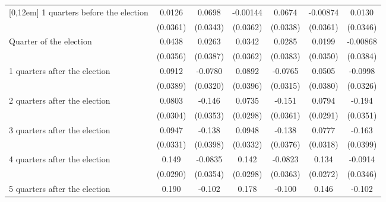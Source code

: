 \begin{table}[!ht]
\begin{tabular}{l*{6}{c}}
[0,12em]
 1 quarters before the election&      0.0126         &      0.0698\sym{*}  &    -0.00144         &      0.0674\sym{*}  &    -0.00874         &      0.0130         \\
                    &    (0.0361)         &    (0.0343)         &    (0.0362)         &    (0.0338)         &    (0.0361)         &    (0.0346)         \\
[0,12em]
Quarter of the election&      0.0438         &      0.0263         &      0.0342         &      0.0285         &      0.0199         &    -0.00868         \\
                    &    (0.0356)         &    (0.0387)         &    (0.0362)         &    (0.0383)         &    (0.0350)         &    (0.0384)         \\
[0,12em]
 1 quarters after the election&      0.0912\sym{*}  &     -0.0780\sym{*}  &      0.0892\sym{*}  &     -0.0765\sym{*}  &      0.0505         &     -0.0998\sym{**} \\
                    &    (0.0389)         &    (0.0320)         &    (0.0396)         &    (0.0315)         &    (0.0380)         &    (0.0326)         \\
[0,12em]
 2 quarters after the election&      0.0803\sym{**} &      -0.146\sym{***}&      0.0735\sym{*}  &      -0.151\sym{***}&      0.0794\sym{**} &      -0.194\sym{***}\\
                    &    (0.0304)         &    (0.0353)         &    (0.0298)         &    (0.0361)         &    (0.0291)         &    (0.0351)         \\
[0,12em]
 3 quarters after the election&      0.0947\sym{**} &      -0.138\sym{***}&      0.0948\sym{**} &      -0.138\sym{***}&      0.0777\sym{*}  &      -0.163\sym{***}\\
                    &    (0.0331)         &    (0.0398)         &    (0.0332)         &    (0.0376)         &    (0.0318)         &    (0.0399)         \\
[0,12em]
 4 quarters after the election&       0.149\sym{***}&     -0.0835\sym{*}  &       0.142\sym{***}&     -0.0823\sym{*}  &       0.134\sym{***}&     -0.0914\sym{**} \\
                    &    (0.0290)         &    (0.0354)         &    (0.0298)         &    (0.0363)         &    (0.0272)         &    (0.0346)         \\
[0,12em]
 5 quarters after the election&       0.190\sym{***}&      -0.102\sym{**} &       0.178\sym{***}&      -0.100\sym{**} &       0.146\sym{***}&      -0.102\sym{**} \\

\end{tabular}
\end{table}
